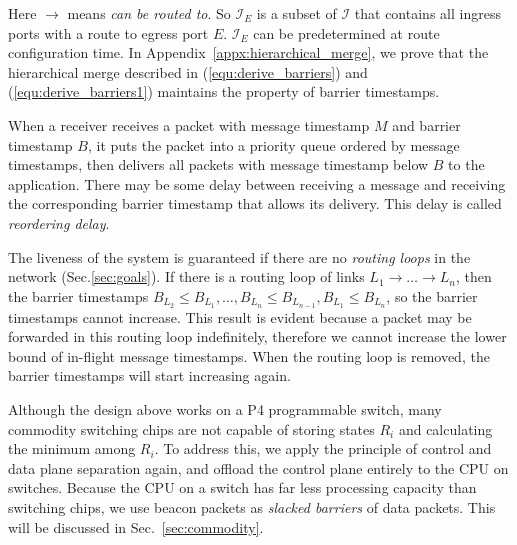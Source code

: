Here $\rightarrow$ means \textit{can be routed to}. So $\mathcal{I}_E$ is a subset of $\mathcal{I}$ that contains all ingress ports with a route to egress port $E$. $\mathcal{I}_E$ can be predetermined at route configuration time.
In Appendix~\ref{appx:hierarchical_merge}, we prove that the hierarchical merge described in (\ref{equ:derive_barriers}) and (\ref{equ:derive_barriers1}) maintains the property of barrier timestamps.

When a receiver receives a packet with message timestamp $M$ and barrier timestamp $B$, it puts the packet into a priority queue ordered by message timestamps, then delivers all packets with message timestamp below $B$ to the application.
There may be some delay between receiving a message and receiving the corresponding barrier timestamp that allows its delivery. This delay is called \textit{reordering delay}. %

The liveness of the system is guaranteed if there are no \textit{routing loops} in the network (Sec.\ref{sec:goals}). If there is a routing loop of links $L_1 \rightarrow \ldots \rightarrow L_n$, then the barrier timestamps $B_{L_2} \leq B_{L_1}, \ldots, B_{L_n} \leq B_{L_{n-1}}, B_{L_1} \leq B_{L_n}$, so the barrier timestamps cannot increase. This result is evident because a packet may be forwarded in this routing loop indefinitely, therefore we cannot increase the lower bound of in-flight message timestamps. When the routing loop is removed, the barrier timestamps will start increasing again.

Although the design above works on a P4 programmable switch, many commodity switching chips are not capable of storing states $R_i$ and calculating the minimum among $R_i$.
To address this, we apply the principle of control and data plane separation again, and offload the control plane entirely to the CPU on switches.
Because the CPU on a switch has far less processing capacity than switching chips, we use beacon packets as \textit{slacked barriers} of data packets. This will be discussed in Sec.~\ref{sec:commodity}.

